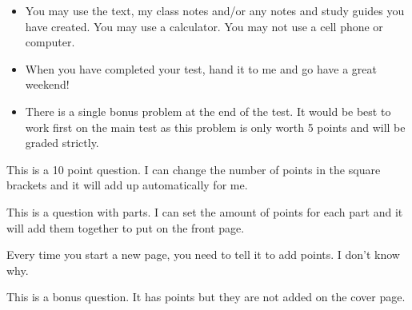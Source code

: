 \documentclass[11pt]{exam}
\begin{document}
\begin{itemize}


\item You may use the text, my class notes and/or any notes and study guides you have created. You may use a calculator. You may not use a cell phone or computer.


\item When you have completed your test, hand it to me and go have a great weekend!

\item There is a single bonus problem at the end of the test. It would be best to work first on the main test as this problem is only worth 5 points and will be graded strictly.

\end{itemize}

\newpage 
\begin{questions}
\addpoints

\question[10] This is a 10 point question. I can change the number of points in the square brackets and it will add up automatically for me.

\question This is a question with parts. I can set the amount of points for each part and it will add them together to put on the front page.


\newpage 
\addpoints

\question[18] Every time you start a new page, you need to tell it to add points. I don't know why.
\vfill

\bonusquestion[5] This is a bonus question. It has points but they are not added on the cover page.
\vfill

\end{questions}
\end{document}
